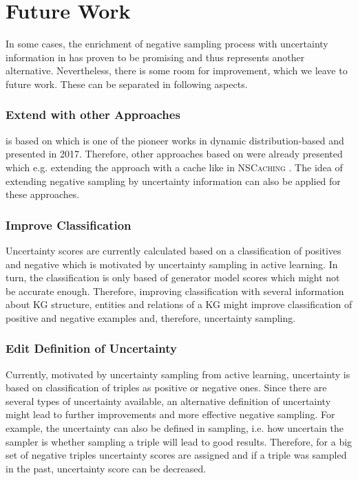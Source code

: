 \section{Future Work} 
\label{sec:futurework}

In some cases, the enrichment of negative sampling process with uncertainty information in \kbgan has proven to be promising and thus represents another alternative.
Nevertheless, there is some room for improvement, which we leave to future work.
These can be separated in following aspects.

\subsubsection{Extend \usgan with other Approaches}

\usgan is based on \kbgan which is one of the pioneer works in dynamic distribution-based and presented in 2017.
Therefore, other approaches based on \kbgan were already presented which e.g. extending the approach with a cache like in \textsc{NSCaching} \cite{zhang2019nscaching}.
The idea of extending negative sampling by uncertainty information can also be applied for these approaches.

\subsubsection{Improve Classification}
Uncertainty scores are currently calculated based on a classification of positives and negative which is motivated by uncertainty sampling in active learning.
In turn, the classification is only based of generator model scores which might not be accurate enough.
Therefore, improving classification with several information about \ac{KG} structure, entities and relations of a \ac{KG} might improve classification of positive and negative examples and, therefore, uncertainty sampling.

\subsubsection{Edit Definition of Uncertainty}
Currently, motivated by uncertainty sampling from active learning, uncertainty is based on classification of triples as positive or negative ones.
Since there are several types of uncertainty available, an alternative definition of uncertainty might lead to further improvements and more effective negative sampling.
For example, the uncertainty can also be defined in sampling, i.e. how uncertain the sampler is whether sampling a triple will lead to good results.
Therefore, for a big set of negative triples uncertainty scores are assigned and if a triple was sampled in the past, uncertainty score can be decreased.


